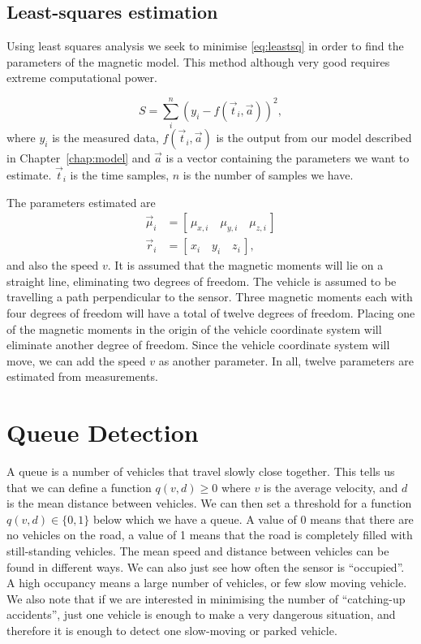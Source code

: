 \subsection{Least-squares estimation}\label{subsec:leastsq}
Using least squares analysis we seek to minimise \eqref{eq:leastsq} in order to find the parameters of the magnetic model. This method although very good requires extreme computational power.

\begin{equation}
	S = \sum_i^n \left(y_i - f(\vec{t}_i,\vec{a})\right)^2,\label{eq:leastsq}
\end{equation}
where $y_i$ is the measured data, $f(\vec{t}_i,\vec{a})$ is the output from our model described in Chapter~\ref{chap:model} and $\vec{a}$ is a vector containing the parameters we want to estimate. $\vec{t}_i$ is the time samples, $n$ is the number of samples we have.

The parameters estimated are
\begin{align}
	\vec{\mu}_i &= \left[\,\mu_{x,i}\quad{}\mu_{y,i}\quad{}\mu_{z,i}\,\right]\\
	\vec{r}_i &= \left[\,x_i\quad{}y_i\quad{}z_i\,\right],
\end{align}
and also the speed $v$. It is assumed that the magnetic moments will lie on a straight line, eliminating two degrees of freedom. The vehicle is assumed to be travelling a path perpendicular to the sensor. Three magnetic moments each with four degrees of freedom will have a total of twelve degrees of freedom. Placing one of the magnetic moments in the origin of the vehicle coordinate system will eliminate another degree of freedom. Since the vehicle coordinate system will move, we can add the speed $v$ as another parameter. In all, twelve parameters are estimated from measurements.

\section{Queue Detection}
A queue is a number of vehicles that travel slowly close together. This tells us that we can define a function $q(v,d) \geq 0$ where $v$ is the average velocity, and $d$ is the mean distance between vehicles. We can then set a threshold for a function $q(v,d) \in \{0,1\}$ below which we have a queue. A value of 0 means that there are no vehicles on the road, a value of 1 means that the road is completely filled with still-standing vehicles. The mean speed and distance between vehicles can be found in different ways. We can also just see how often the sensor is ``occupied''. A high occupancy means a large number of vehicles, or few slow moving vehicle. We also note that if we are interested in minimising the number of ``catching-up accidents'', just one vehicle is enough to make a very dangerous situation, and therefore it is enough to detect one slow-moving or parked vehicle.

